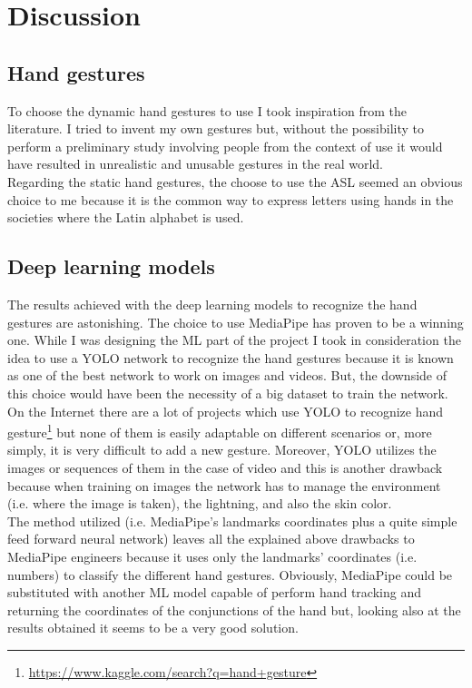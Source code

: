 \documentclass[../thesis.tex]{subfiles}
\begin{document}
\chapter{Discussion}\label{cap:discussion}

\section{Hand gestures}
To choose the dynamic hand gestures to use I took inspiration from the literature. I tried to invent my own gestures but, without the possibility to perform a preliminary study involving people from the context of use it would have resulted in unrealistic and unusable gestures in the real world.\\

Regarding the static hand gestures, the choose to use the \acrshort{ASL} seemed an obvious choice to me because it is the common way to express letters using hands in the societies where the Latin alphabet is used.

\section{Deep learning models}
The results achieved with the deep learning models to recognize the hand gestures are astonishing. The choice to use MediaPipe has proven to be a winning one. While I was designing the \acrshort{ML} part of the project I took in consideration the idea to use a YOLO network to recognize the hand gestures because it is known as one of the best network to work on images and videos. But, the downside of this choice would have been the necessity of a big dataset to train the network. On the Internet there are a lot of projects which use YOLO to recognize hand gesture\footnote{\href{https://www.kaggle.com/search?q=hand+gesture}{https://www.kaggle.com/search?q=hand+gesture}} but none of them is easily adaptable on different scenarios or, more simply, it is very difficult to add a new gesture. Moreover, YOLO utilizes the images or sequences of them in the case of video and this is another drawback because when training on images the network has to manage the environment (i.e. where the image is taken), the lightning, and also the skin color.\\

The method utilized (i.e. MediaPipe's landmarks coordinates plus a quite simple feed forward neural network) leaves all the explained above drawbacks to MediaPipe engineers because it uses only the landmarks' coordinates (i.e. numbers) to classify the different hand gestures. Obviously, MediaPipe could be substituted with another \acrshort{ML} model capable of perform hand tracking and returning the coordinates of the conjunctions of the hand but, looking also at the results obtained it seems to be a very good solution.
\end{document}
